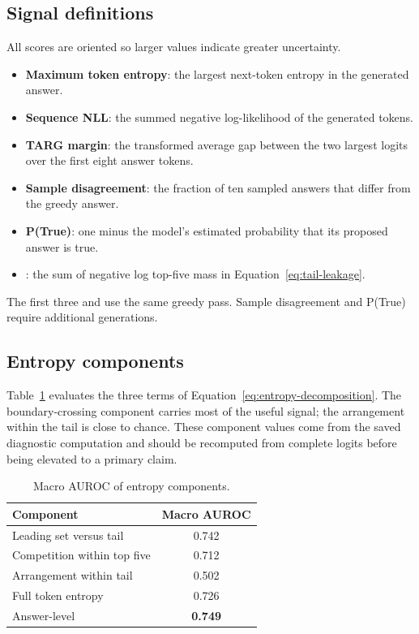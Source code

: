 \subsection{Signal definitions}

All scores are oriented so larger values indicate greater uncertainty.
\begin{itemize}
    \item \textbf{Maximum token entropy}: the largest next-token entropy in
    the generated answer.
    \item \textbf{Sequence NLL}: the summed negative log-likelihood of the
    generated tokens.
    \item \textbf{TARG margin}: the transformed average gap between the two
    largest logits over the first eight answer tokens.
    \item \textbf{Sample disagreement}: the fraction of ten sampled answers
    that differ from the greedy answer.
    \item \textbf{P(True)}: one minus the model's estimated probability that
    its proposed answer is true.
    \item \textbf{\tailleak{}}: the sum of negative log top-five mass in
    Equation~\ref{eq:tail-leakage}.
\end{itemize}
The first three and \tailleak{} use the same greedy pass. Sample disagreement
and P(True) require additional generations.

\subsection{Entropy components}

Table~\ref{tab:entropy-components} evaluates the three terms of
Equation~\ref{eq:entropy-decomposition}. The boundary-crossing component
carries most of the useful signal; the arrangement within the tail is close to
chance. These component values come from the saved diagnostic computation and
should be recomputed from complete logits before being elevated to a primary
claim.

\begin{table}[h]
\caption{Macro AUROC of entropy components.}
\label{tab:entropy-components}
\centering
\small
\begin{tabular}{lc}
\toprule
Component & Macro AUROC \\
\midrule
Leading set versus tail & 0.742 \\
Competition within top five & 0.712 \\
Arrangement within tail & 0.502 \\
Full token entropy & 0.726 \\
Answer-level \tailleak{} & \textbf{0.749} \\
\bottomrule
\end{tabular}
\end{table}

